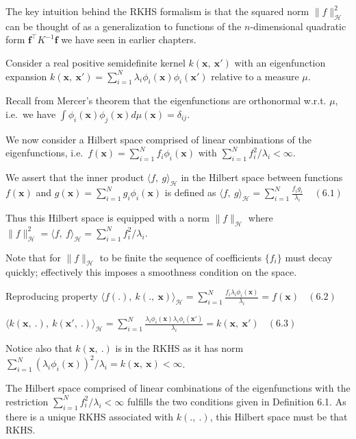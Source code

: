 \documentclass[
  ignorenonframetext,
]{beamer}
\begin{document}
\begin{frame}{}
\protect\hypertarget{section}{}
The key intuition behind the RKHS formalism is that the squared norm
\(\|f\|^2_{\mathcal H}\) can be thought of as a generalization to
functions of the \(n\)-dimensional quadratic form
\(\pmb f^{\top} K^{-1} \pmb f\) we have seen in earlier chapters.

Consider a real positive semidefinite kernel \(k(\pmb x,\ \pmb x')\)
with an eigenfunction expansion
\(k(\pmb x,\ \pmb x') = \sum^N_{i=1}\lambda_i\phi _i(\pmb x)\phi_i( \pmb x')\)
relative to a measure \(\mu\).

Recall from Mercer's theorem that the eigenfunctions are orthonormal
w.r.t. \(\mu\), i.e.~we have
\(\int \phi_i(\pmb x)\phi_j(\pmb x) d\mu (\pmb x) = \delta_{ij}\).
\end{frame}

\begin{frame}{}
\protect\hypertarget{section-1}{}
We now consider a Hilbert space comprised of linear combinations of the
eigenfunctions, i.e.~\(f(\pmb x) = \sum^N_{i=1}f_i\phi_i(\pmb x)\) with
\(\sum ^N_{i=1}f_i^2/\lambda_i < \infty\).

We assert that the inner product \(\langle f,\ g\rangle_{\mathcal H}\)
in the Hilbert space between functions \(f(\pmb x)\) and
\(g(\pmb x) = \sum^N_{i=1}g_i\phi_i(\pmb x)\) is defined as
\(\langle f,\ g\rangle_{\mathcal H}= \sum_{i=1}^N \frac {f_ig_i} {\lambda_i} \ \ \ \ \ (6.1)\)

Thus this Hilbert space is equipped with a norm \(\|f\|_{\mathcal H}\)
where
\(\|f\|^2_{\mathcal H} = \langle f,\ f\rangle_{\mathcal H}=\sum^N_{i=1}f_i^2/\lambda_i\).

Note that for \(\|f\|_{\mathcal H}\) to be finite the sequence of
coefficients \(\{f_i\}\) must decay quickly; effectively this imposes a
smoothness condition on the space.
\end{frame}

\begin{frame}{Reproducing property}
\protect\hypertarget{reproducing-property}{}
\(\langle f(.),\ k(.,\ \pmb x)\rangle_{\mathcal H}= \sum_{i=1}^N \frac {f_i\lambda_i\phi _i(\pmb x)} {\lambda_i} = f(\pmb x) \ \ \ \ (6.2)\)

\(\langle k(\pmb x,\ .),\ k(\pmb x',\ .)\rangle_{\mathcal H}= \sum_{i=1}^N \frac {\lambda_i\phi_i(\pmb x)\lambda_i\phi_i( \pmb x')} {\lambda_i} = k(\pmb x,\ \pmb x') \ \ \ \ (6.3)\)

Notice also that \(k(\pmb x,\ .)\) is in the RKHS as it has norm
\(\sum^N_{i=1}(\lambda_i\phi_i(\pmb x))^2/\lambda_i = k(\pmb x,\ \pmb x) < \infty\).

The Hilbert space comprised of linear combinations of the eigenfunctions
with the restriction \(\sum^N_{i=1}f_i^2/\lambda_i <\infty\) fulfills
the two conditions given in Definition 6.1. As there is a unique RKHS
associated with \(k(.,\ .)\), this Hilbert space must be that RKHS.
\end{frame}
\end{document}
